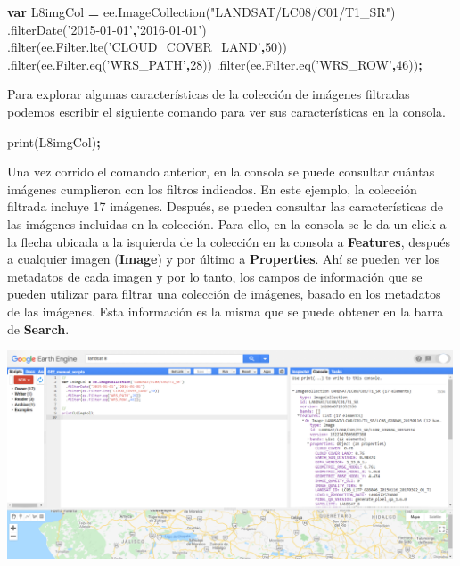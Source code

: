 \documentclass[
]{article}
\newenvironment{Shaded}{\begin{snugshade}}{\end{snugshade}}
\newcommand{\AttributeTok}[1]{\textcolor[rgb]{0.77,0.63,0.00}{#1}}
\newcommand{\DecValTok}[1]{\textcolor[rgb]{0.00,0.00,0.81}{#1}}
\newcommand{\KeywordTok}[1]{\textcolor[rgb]{0.13,0.29,0.53}{\textbf{#1}}}
\newcommand{\NormalTok}[1]{#1}
\newcommand{\OperatorTok}[1]{\textcolor[rgb]{0.81,0.36,0.00}{\textbf{#1}}}
\newcommand{\StringTok}[1]{\textcolor[rgb]{0.31,0.60,0.02}{#1}}
\newcommand{\VariableTok}[1]{\textcolor[rgb]{0.00,0.00,0.00}{#1}}
\begin{document}
\begin{Shaded}
\begin{Highlighting}[]
\KeywordTok{var}\NormalTok{ L8imgCol }\OperatorTok{=} \VariableTok{ee}\NormalTok{.}\AttributeTok{ImageCollection}\NormalTok{(}\StringTok{"LANDSAT/LC08/C01/T1_SR"}\NormalTok{)}
\NormalTok{  .}\AttributeTok{filterDate}\NormalTok{(}\StringTok{'2015-01-01'}\OperatorTok{,}\StringTok{'2016-01-01'}\NormalTok{)}
\NormalTok{  .}\AttributeTok{filter}\NormalTok{(}\VariableTok{ee}\NormalTok{.}\VariableTok{Filter}\NormalTok{.}\AttributeTok{lte}\NormalTok{(}\StringTok{'CLOUD_COVER_LAND'}\OperatorTok{,}\DecValTok{50}\NormalTok{))}
\NormalTok{  .}\AttributeTok{filter}\NormalTok{(}\VariableTok{ee}\NormalTok{.}\VariableTok{Filter}\NormalTok{.}\AttributeTok{eq}\NormalTok{(}\StringTok{'WRS_PATH'}\OperatorTok{,}\DecValTok{28}\NormalTok{))}
\NormalTok{  .}\AttributeTok{filter}\NormalTok{(}\VariableTok{ee}\NormalTok{.}\VariableTok{Filter}\NormalTok{.}\AttributeTok{eq}\NormalTok{(}\StringTok{'WRS_ROW'}\OperatorTok{,}\DecValTok{46}\NormalTok{))}\OperatorTok{;}
\end{Highlighting}
\end{Shaded}

Para explorar algunas características de la colección de imágenes
filtradas podemos escribir el siguiente comando para ver sus
características en la consola.

\begin{Shaded}
\begin{Highlighting}[]
\AttributeTok{print}\NormalTok{(L8imgCol)}\OperatorTok{;}
\end{Highlighting}
\end{Shaded}

Una vez corrido el comando anterior, en la consola se puede consultar
cuántas imágenes cumplieron con los filtros indicados. En este ejemplo,
la colección filtrada incluye 17 imágenes. Después, se pueden consultar
las características de las imágenes incluidas en la colección. Para
ello, en la consola se le da un click a la flecha ubicada a la isquierda
de la colección en la consola a \textbf{Features}, después a cualquier
imagen (\textbf{Image}) y por último a \textbf{Properties}. Ahí se
pueden ver los metadatos de cada imagen y por lo tanto, los campos de
información que se pueden utilizar para filtrar una colección de
imágenes, basado en los metadatos de las imágenes. Esta información es
la misma que se puede obtener en la barra de \textbf{Search}.

\includegraphics[width=500px]{Img/CamposImgCol}
\end{document}
